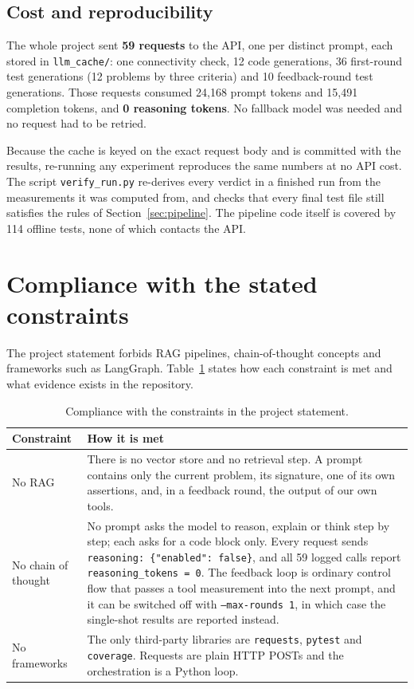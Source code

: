 \documentclass[11pt,a4paper]{article}
\begin{document}
\subsection{Cost and reproducibility}

The whole project sent \textbf{59 requests} to the API, one per distinct prompt, each stored in
\texttt{llm\_cache/}: one connectivity check, 12 code generations, 36 first-round test generations (12 problems
by three criteria) and 10 feedback-round test generations. Those requests consumed 24{,}168 prompt tokens and
15{,}491 completion tokens, and \textbf{0 reasoning tokens}. No fallback model was needed and no request had to
be retried.

Because the cache is keyed on the exact request body and is committed with the results, re-running any
experiment reproduces the same numbers at no API cost. The script \texttt{verify\_run.py} re-derives every
verdict in a finished run from the measurements it was computed from, and checks that every final test file
still satisfies the rules of Section~\ref{sec:pipeline}. The pipeline code itself is covered by 114 offline
tests, none of which contacts the API.

\section{Compliance with the stated constraints}
\label{sec:constraints}

The project statement forbids RAG pipelines, chain-of-thought concepts and frameworks such as LangGraph.
Table~\ref{tab:compliance} states how each constraint is met and what evidence exists in the repository.

\begin{table}[htbp]
\centering
\small
\caption{Compliance with the constraints in the project statement.}
\label{tab:compliance}
\begin{tabular}{@{}p{2.6cm}p{11.4cm}@{}}
\toprule
\textbf{Constraint} & \textbf{How it is met} \\
\midrule
No RAG & There is no vector store and no retrieval step. A prompt contains only the current problem, its
signature, one of its own assertions, and, in a feedback round, the output of our own tools. \\
\addlinespace
No chain of thought & No prompt asks the model to reason, explain or think step by step; each asks for a code
block only. Every request sends \texttt{reasoning: \{"enabled": false\}}, and all 59 logged calls report
\texttt{reasoning\_tokens = 0}. The feedback loop is ordinary control flow that passes a tool measurement into
the next prompt, and it can be switched off with \texttt{--max-rounds 1}, in which case the single-shot results
are reported instead. \\
\addlinespace
No frameworks & The only third-party libraries are \texttt{requests}, \texttt{pytest} and \texttt{coverage}.
Requests are plain HTTP POSTs and the orchestration is a Python loop. \\
\bottomrule
\end{tabular}
\end{table}
\end{document}
